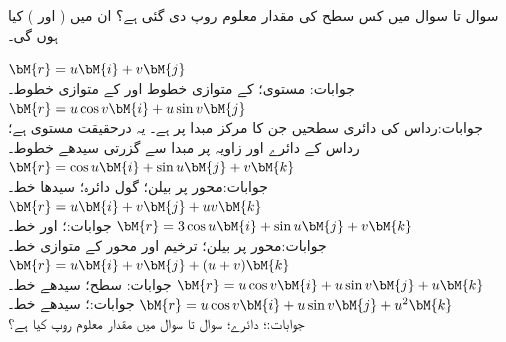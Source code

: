 سوال  تا سوال  میں کس سطح کی مقدار معلوم روپ دی گئی ہے؟ ان میں  ( اور ) کیا ہوں گی۔  

\quad
$\bM{r}=u\bM{i}+v\bM{j}$\\
جوابات:\quad {} مستوی؛  کے متوازی خطوط اور  کے متوازی خطوط۔
\quad
$\bM{r}=u\cos v\bM{i}+u\sin v\bM{j}$\\
جوابات:\quad رداس  کی دائری سطحیں جن کا مرکز مبدا پر ہے۔ یہ درحقیقت  مستوی ہے؛ رداس  کے دائرے اور زاویہ  پر مبدا سے گزرتی سیدھے خطوط۔
\quad
$\bM{r}=\cos u\bM{i}+\sin u\bM{j}+v\bM{k}$\\
جوابات:\quad محور  پر  بیلن؛ گول دائرہ؛ سیدھا خط۔
\quad
$\bM{r}=u\bM{i}+v\bM{j}+uv\bM{k}$\\
جوابات:\quad {}؛  اور  خط۔
\quad
$\bM{r}=3\cos u\bM{i}+\sin u \bM{j}+v\bM{k}$\\
جوابات:\quad محور  پر  بیلن؛ ترخیم اور محور  کے متوازی خط۔
\quad
$\bM{r}=u\bM{i}+v \bM{j}+(u+v)\bM{k}$\\
جوابات:\quad {} سطح؛ سیدھے خط۔
\quad
$\bM{r}=u\cos v\bM{i}+u\sin v \bM{j}+u\bM{k}$\\
جوابات:\quad  {}؛ سیدھے خط۔
\quad
$\bM{r}=u\cos v\bM{i}+u\sin v \bM{j}+u^2\bM{k}$\\
جوابات:\quad {}؛ دائرے؛ 
سوال  تا سوال  میں مقدار معلوم روپ کیا ہے؟

